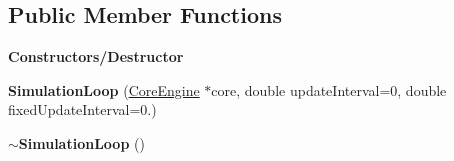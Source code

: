 \subsection*{Public Member Functions}
\begin{Indent}\textbf{ Constructors/\+Destructor}\par
\begin{DoxyCompactItemize}
\item 
\mbox{\label{classrev_1_1_simulation_loop_a3caaaf354a409ca6eadb02a65c2c2fc4}} 
{\bfseries Simulation\+Loop} (\mbox{\hyperlink{classrev_1_1_core_engine}{Core\+Engine}} $\ast$core, double update\+Interval=0, double fixed\+Update\+Interval=0.)
\item 
\mbox{\label{classrev_1_1_simulation_loop_a25207c901ccb265e0cf919bdb0aae98c}} 
{\bfseries $\sim$\+Simulation\+Loop} ()
\end{DoxyCompactItemize}
\end{Indent}
